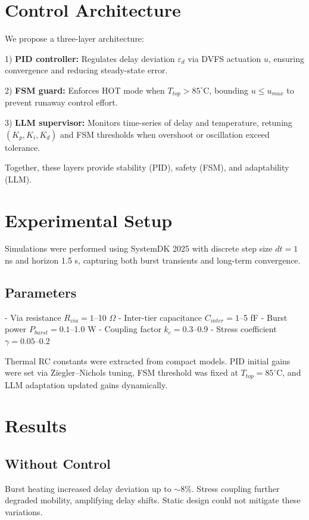 \documentclass[conference]{IEEEtran}
\begin{document}
\section{Control Architecture}
We propose a three-layer architecture:  

1) \textbf{PID controller:} Regulates delay deviation $\varepsilon_d$ via DVFS actuation $u$, ensuring convergence and reducing steady-state error.  

2) \textbf{FSM guard:} Enforces HOT mode when $T_{top}>85^\circ$C, bounding $u\leq u_{max}$ to prevent runaway control effort.  

3) \textbf{LLM supervisor:} Monitors time-series of delay and temperature, retuning $(K_p,K_i,K_d)$ and FSM thresholds when overshoot or oscillation exceed tolerance.  

Together, these layers provide stability (PID), safety (FSM), and adaptability (LLM).

\section{Experimental Setup}
Simulations were performed using SystemDK 2025 with discrete step size $dt=1$ ns and horizon 1.5 s, capturing both burst transients and long-term convergence.  

\subsection{Parameters}
- Via resistance $R_{via} = 1$--10 $\Omega$  
- Inter-tier capacitance $C_{inter} = 1$--5 fF  
- Burst power $P_{burst} = 0.1$--1.0 W  
- Coupling factor $k_c = 0.3$--0.9  
- Stress coefficient $\gamma = 0.05$--0.2  

Thermal RC constants were extracted from compact models. PID initial gains were set via Ziegler–Nichols tuning, FSM threshold was fixed at $T_{top}=85^\circ$C, and LLM adaptation updated gains dynamically.

\section{Results}
\subsection{Without Control}
Burst heating increased delay deviation up to $\sim$8\%. Stress coupling further degraded mobility, amplifying delay shifts. Static design could not mitigate these variations.  
\end{document}
